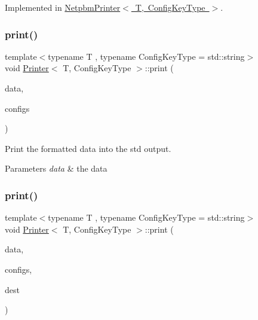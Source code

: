 Implemented in \mbox{\hyperlink{class_netpbm_printer_a7a361fc4d114a12cb5c2311744dc3d3d}{Netpbm\+Printer$<$ T, Config\+Key\+Type $>$}}.

\mbox{\label{class_printer_a593e70d807258eefa413a52cd8e3c9ee}} 
\subsubsection{\texorpdfstring{print()}{print()}\hspace{0.1cm}{\footnotesize\ttfamily [1/2]}}
{\footnotesize\ttfamily template$<$typename T , typename Config\+Key\+Type  = std\+::string$>$ \\
void \mbox{\hyperlink{class_printer}{Printer}}$<$ T, Config\+Key\+Type $>$\+::print (\begin{DoxyParamCaption}\item[{const T $\ast$}]{data,  }\item[{const \mbox{\hyperlink{class_configs}{Configs}}$<$ Config\+Key\+Type $>$ \&}]{configs }\end{DoxyParamCaption})\hspace{0.3cm}{\ttfamily [inline]}}



Print the formatted data into the std output. 


\begin{DoxyParams}{Parameters}
{\em data} & the data \\
\hline
\end{DoxyParams}
\mbox{\label{class_printer_a726243ffd10cdc4c706767513c175a1b}} 
\subsubsection{\texorpdfstring{print()}{print()}\hspace{0.1cm}{\footnotesize\ttfamily [2/2]}}
{\footnotesize\ttfamily template$<$typename T , typename Config\+Key\+Type  = std\+::string$>$ \\
void \mbox{\hyperlink{class_printer}{Printer}}$<$ T, Config\+Key\+Type $>$\+::print (\begin{DoxyParamCaption}\item[{const T $\ast$}]{data,  }\item[{const \mbox{\hyperlink{class_configs}{Configs}}$<$ Config\+Key\+Type $>$ \&}]{configs,  }\item[{const std\+::string \&}]{dest }\end{DoxyParamCaption})\hspace{0.3cm}{\ttfamily [inline]}}



